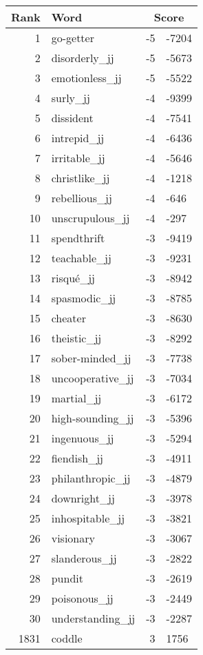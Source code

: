 \begin{longtable}[!htbp]{| rlr@{.}l |}
    \hline
    \textbf{Rank} & \textbf{Word} & \multicolumn{2}{c|}{\textbf{Score}} \\
    \hline
    \endhead
    1 & go-getter & -5 & -7204 \\
    2 & disorderly\_jj & -5 & -5673 \\
    3 & emotionless\_jj & -5 & -5522 \\
    4 & surly\_jj & -4 & -9399 \\
    5 & dissident & -4 & -7541 \\
    6 & intrepid\_jj & -4 & -6436 \\
    7 & irritable\_jj & -4 & -5646 \\
    8 & christlike\_jj & -4 & -1218 \\
    9 & rebellious\_jj & -4 & -646 \\
    10 & unscrupulous\_jj & -4 & -297 \\
    11 & spendthrift & -3 & -9419 \\
    12 & teachable\_jj & -3 & -9231 \\
    13 & risqué\_jj & -3 & -8942 \\
    14 & spasmodic\_jj & -3 & -8785 \\
    15 & cheater & -3 & -8630 \\
    16 & theistic\_jj & -3 & -8292 \\
    17 & sober-minded\_jj & -3 & -7738 \\
    18 & uncooperative\_jj & -3 & -7034 \\
    19 & martial\_jj & -3 & -6172 \\
    20 & high-sounding\_jj & -3 & -5396 \\
    21 & ingenuous\_jj & -3 & -5294 \\
    22 & fiendish\_jj & -3 & -4911 \\
    23 & philanthropic\_jj & -3 & -4879 \\
    24 & downright\_jj & -3 & -3978 \\
    25 & inhospitable\_jj & -3 & -3821 \\
    26 & visionary & -3 & -3067 \\
    27 & slanderous\_jj & -3 & -2822 \\
    28 & pundit & -3 & -2619 \\
    29 & poisonous\_jj & -3 & -2449 \\
    30 & understanding\_jj & -3 & -2287 \\
    1831 & coddle & 3 & 1756 \\

\end{longtable}
